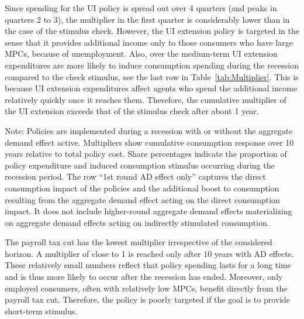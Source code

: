 \documentclass[qe,draft]{econsocart}
\theoremstyle{plain}
\theoremstyle{definition}
\begin{document}
Since spending for the UI policy is spread out over 4 quarters (and peaks in quarters 2 to 3), the multiplier in the first quarter is considerably lower than in the case of the stimulus check.
However, the UI extension policy is targeted in the sense that it provides additional income only to those consumers who have large MPCs, because of unemployment.
Also, over the medium-term UI extension expenditures   are more likely to induce consumption spending during the recession compared to the check stimulus, see the last row in Table~\ref{tab:Multiplier}.
This is because UI extension expenditures affect agents who spend the additional income relatively quickly once it reaches them.
Therefore, the cumulative multiplier of the UI extension exceeds that of the stimulus check after about 1 year.

\begin{table}[tb] 
  \caption{\pregenmark Comparing fiscal stimulus policy effectiveness}
  \label{tab:Multiplier} %
  \centering


  \noindent\parbox{\textwidth}{
    \medskip
    \footnotesize Note: Policies are implemented during a recession with or without the aggregate demand effect active. Multipliers show cumulative consumption response over 10 years relative to total policy cost. Share percentages indicate the proportion of policy expenditure and induced consumption stimulus occurring during the recession period. The row ``1st round AD effect only'' captures the direct consumption impact of the policies and the additional boost to consumption resulting from the aggregate demand effect acting on the direct consumption impact. It does not include higher-round aggregate demand effects materializing on aggregate demand effects acting on indirectly stimulated consumption.
  }
\end{table}

\vspace{0.5em}

The payroll tax cut has the lowest multiplier irrespective of the considered horizon.
A multiplier of close to 1 is reached only after 10 years with AD effects.
These relatively small numbers reflect that policy spending lasts for a long time and is thus more likely to occur after the recession has ended.
Moreover, only employed consumers, often with relatively low MPCs, benefit directly from the payroll tax cut.
Therefore, the policy is poorly targeted if the goal is to provide short-term stimulus.
\end{document}

